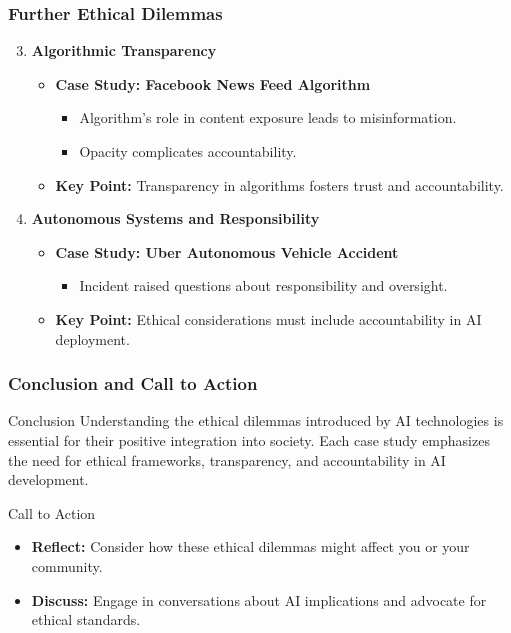 \documentclass{beamer}
\begin{document}
\begin{frame}[fragile]
    \frametitle{Further Ethical Dilemmas}
    \begin{enumerate}
        \setcounter{enumi}{2} %
        \item \textbf{Algorithmic Transparency}
            \begin{itemize}
                \item \textbf{Case Study: Facebook News Feed Algorithm}
                \begin{itemize}
                    \item Algorithm's role in content exposure leads to misinformation.
                    \item Opacity complicates accountability.
                \end{itemize}
                \item \textbf{Key Point:} Transparency in algorithms fosters trust and accountability.
            \end{itemize}
        
        \item \textbf{Autonomous Systems and Responsibility}
            \begin{itemize}
                \item \textbf{Case Study: Uber Autonomous Vehicle Accident}
                \begin{itemize}
                    \item Incident raised questions about responsibility and oversight.
                \end{itemize}
                \item \textbf{Key Point:} Ethical considerations must include accountability in AI deployment.
            \end{itemize}
    \end{enumerate}
\end{frame}

\begin{frame}[fragile]
    \frametitle{Conclusion and Call to Action}
    \begin{block}{Conclusion}
        Understanding the ethical dilemmas introduced by AI technologies is essential for their positive integration into society. Each case study emphasizes the need for ethical frameworks, transparency, and accountability in AI development.
    \end{block} 

    \begin{block}{Call to Action}
        \begin{itemize}
            \item \textbf{Reflect:} Consider how these ethical dilemmas might affect you or your community.
            \item \textbf{Discuss:} Engage in conversations about AI implications and advocate for ethical standards.
        \end{itemize}
    \end{block}
\end{frame}
\end{document}
